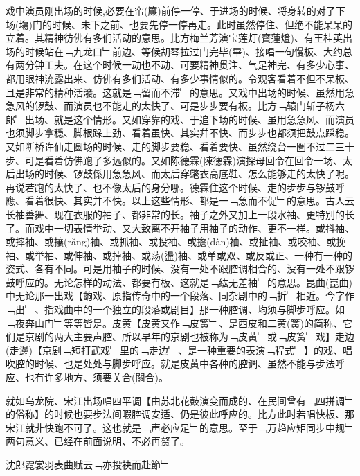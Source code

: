 \documentclass{zhvt-classic}
\begin{document}
戏中演员刚出场的时候,必要在帘(簾)前停一停、于进场的时候、将身转的对了下场(塲)门的时候、未下之前、也要先停一停再走。此时虽然停住、但绝不能呆呆的立着。其精神彷佛有多们活动的意思。比方梅兰芳演宝莲灯(寳蓮燈)、有王桂英出场的时候站在﹁九龙口﹂前边、等候胡琴拉过门完毕(畢)、接唱一句慢板、大约总有两分钟工夫。在这个时候一动也不动、可要精神贯注、气足神完、有多少心事、都用眼神㳘露出来、仿佛有多们活动、有多少事情似的。令观客看着不但不呆板、且是非常的精种活潑。这就是﹁留而不滞﹂的意思。又戏中出场的时候、虽然用急急风的锣鼓、而演员也不能走的太快了、可是步步要有板。比方﹁辕门斩子杨六郎﹂出场、就是这个情形。又如穿靠的戏、于追下场的时候、虽用急急风、而演员也须脚步拿穏、脚根跺上劲、看着虽快、其实幷不快、而步步也都须把鼓点踩稳。又如断桥许仙走圆场的时候、走的脚步要稳、看着要快、虽然绕台一圏不过二三十步、可是看着仿佛跑了多远似的。又如陈德霖(陳德霖)演探母回令在回令一场、太后出场的时候、锣鼓係用急急风、而太后穿氅衣高底鞋、怎么能够走的太快了呢。再说若跑的太快了、也不像太后的身分哪。德霖住这个时候、走的步步与锣鼓呼應、看着很快、其实并不快。以上这些情形、都是一﹁急而不促﹂的意思。古人云长袖善舞、现在衣服的袖子、都非常的长。袖子之外又加上一段水袖、更特别的长了。而戏中一切表情举动、又大致离不开袖子用袖子的动作、更不一样。或抖袖、或摔袖、或攘(rǎng)袖、或抓袖、或投袖、或擔(dàn)袖、或扯袖、或咬袖、或挽袖、或举袖、或伸袖、或掉袖、或荡(盪)袖、或单或双、或反或正、一种有一种的姿式、各有不同。可是用袖子的时候、没有一处不跟腔调相合的、没有一处不跟锣鼓呼应的。无论怎样的动法、都要有板、这就是﹁纮无差袖﹂的意思。昆曲(崑曲)中无论那一出戏【齣戏、原指传奇中的一个段落、同杂剧中的﹁折﹂相近。今字作﹁出﹂、指戏曲中的一个独立的段落或剧目】那一种腔调、均须与脚步呼应。如﹁夜奔山门﹂等等皆是。皮黄【皮黄又作﹁皮簧﹂、是西皮和二黄(簧)的简称、它们是京剧的两大主要声腔、所以早年的京剧也被称为﹁皮黄﹂或﹁皮簧﹂戏】走边(走邊)【京剧﹁短打武戏﹂里的﹁走边﹂、是一种重要的表演﹁程式﹂】的戏、唱吹腔的时候、也是处处与脚步呼应。就是皮黄中各种的腔调、虽然不能与步法呼应、也有许多地方、须要关合(關合)。

就如乌龙院、宋江出场唱四平调【由苏北花鼓演变而成的、在民间曾有﹁四拼调﹂的俗称】的时候也要步法间暇腔调安适、仍是彼此呼应的。比方此时若唱快板、那宋江就非快跑不可了。这也就是﹁声必应足﹂的意思。至于﹁万趋应矩同步中规﹂两句意义、已经在前面说明、不必再赘了。
\begin{preface}
  
沈郎霓裳羽表曲赋云﹁亦投袂而赴節﹂
\end{preface}
\end{document}
